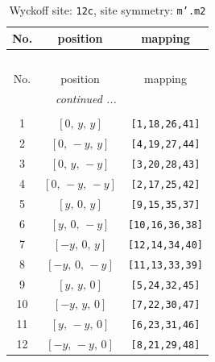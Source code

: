 \documentclass[fleqn,8pt]{jsarticle}
\begin{document}
\begin{longtable}{ccc}
\caption{Wyckoff site: {\tt 12c}, site symmetry: {\tt m'.m2}}
 \\
 \hline \hline
No. & position & mapping \\ \hline \endfirsthead

\multicolumn{2}{l}{\tablename\ \thetable{}} \\
 \hline \hline
No. & position & mapping \\ \hline \endhead

 \hline \hline
\multicolumn{2}{r}{\footnotesize\it continued ...} \\ \endfoot

 \hline \hline
\multicolumn{2}{r}{} \\ \endlastfoot

1 & $\left[ 0,\, y,\, y \right]$ & {\tt [1,18,26,41]} \\ \hline
2 & $\left[ 0,\, - y,\, y \right]$ & {\tt [4,19,27,44]} \\ \hline
3 & $\left[ 0,\, y,\, - y \right]$ & {\tt [3,20,28,43]} \\ \hline
4 & $\left[ 0,\, - y,\, - y \right]$ & {\tt [2,17,25,42]} \\ \hline
5 & $\left[ y,\, 0,\, y \right]$ & {\tt [9,15,35,37]} \\ \hline
6 & $\left[ y,\, 0,\, - y \right]$ & {\tt [10,16,36,38]} \\ \hline
7 & $\left[ - y,\, 0,\, y \right]$ & {\tt [12,14,34,40]} \\ \hline
8 & $\left[ - y,\, 0,\, - y \right]$ & {\tt [11,13,33,39]} \\ \hline
9 & $\left[ y,\, y,\, 0 \right]$ & {\tt [5,24,32,45]} \\ \hline
10 & $\left[ - y,\, y,\, 0 \right]$ & {\tt [7,22,30,47]} \\ \hline
11 & $\left[ y,\, - y,\, 0 \right]$ & {\tt [6,23,31,46]} \\ \hline
12 & $\left[ - y,\, - y,\, 0 \right]$ & {\tt [8,21,29,48]} \\
\end{longtable}
\renewcommand{\arraystretch}{1.2}
\end{document}
